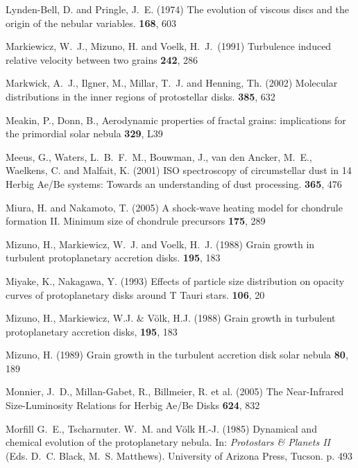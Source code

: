 \begin{literature}
\item
Lynden-Bell, D. and Pringle, J.~E. (1974) The evolution of viscous discs and
the origin of the nebular variables. \mn \textbf{168}, 603

\item
Markiewicz, W.~J., Mizuno, H. and Voelk, H.~J.\ (1991) Turbulence induced
relative velocity between two grains \aap \textbf{242}, 286

\item
Markwick, A.~J., Ilgner, M., Millar, T.~J. and Henning, Th. (2002) Molecular
distributions in the inner regions of protostellar disks. \aap \textbf{385},
632

\item
Meakin, P., Donn, B., Aerodynamic properties of fractal grains:
implications for the primordial solar nebula \apj \textbf{329}, L39

\item
Meeus, G., Waters, L.~B.~F.~M., Bouwman, J., van den Ancker, M.~E.,
Waelkens, C.  and Malfait, K. (2001) ISO spectroscopy of circumstellar dust
in 14 Herbig Ae/Be systems: Towards an understanding of dust
processing. \aap \textbf{365}, 476

\item
Miura, H. and Nakamoto, T. (2005) A shock-wave heating model for chondrule
formation II. Minimum size of chondrule precursors  \ica \textbf{175}, 289

\item
Mizuno, H., Markiewicz, W.~J. and Voelk, H.~J. (1988) Grain growth in
turbulent protoplanetary accretion disks. \aap \textbf{195}, 183

\item
Miyake, K., Nakagawa, Y. (1993) Effects of particle size distribution on
opacity curves of protoplanetary disks around T Tauri stars. \ica
\textbf{106}, 20

\item Mizuno, H., Markiewicz, W.J. \& V\"olk, H.J. (1988) 
  Grain growth in turbulent protoplanetary accretion disks,
  \aap \textbf{195}, 183

\item
Mizuno, H. (1989) Grain growth in the turbulent accretion disk solar
nebula \ica \textbf{80}, 189

\item
Monnier, J.~D., Millan-Gabet, R., Billmeier, R. et al. (2005)
The Near-Infrared Size-Luminosity Relations for Herbig Ae/Be Disks
\apj \textbf{624}, 832

\item
Morfill G.~E., Tscharnuter. W.~M. and V\"olk H.-J. (1985) Dynamical and
chemical evolution of the protoplanetary nebula. In: \textit{Protostars \&
Planets II} (Eds. D.~C. Black, M.~S. Matthews). University of Arizona Press,
Tucson. p. 493


\end{literature}
